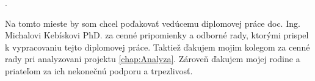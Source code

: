 \newpage
\phantom.
\vspace{12cm}
\vspace{2em}
\bigskip
\noindent

Na tomto mieste by som chcel poďakovať vedúcemu diplomovej práce doc. Ing. Michalovi Kebískovi PhD.  za cenné pripomienky a odborné rady, ktorými prispel k vypracovaniu tejto diplomovej práce. Taktiež ďakujem mojim kolegom za cenné rady pri analyzovani projektu \autoref{chap:Analyza}. Zároveň ďakujem mojej rodine a priateľom za ich nekonečnú podporu a trpezlivosť. 

\vspace{2em}